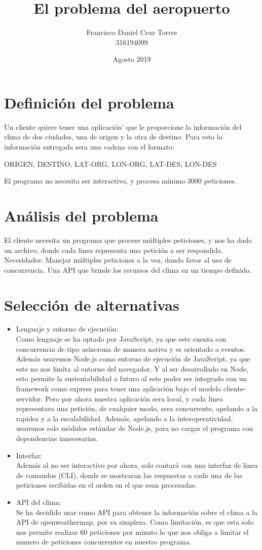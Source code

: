 \documentclass{article}
\title{El problema del aeropuerto}
\author{Francisco Daniel Cruz Torres \\ 316194099}
\date{Agosto 2019}
\begin{document}
\maketitle

\section{Definición del problema}
Un cliente quiere tener una aplicación' que le proporcione la información del clima de dos ciudades, una de origen y la otra de destino.
Para esto la información entregada sera una cadena con el formato: \begin{center}
ORIGEN, DESTINO, LAT-ORG, LON-ORG, LAT-DES, LON-DES
\end{center}
El programa no necesita ser interactivo, y procesa mínimo 3000 peticiones.

\section{Análisis del problema}
El cliente necesita un programa que procese múltiples peticiones, y nos ha dado un archivo, donde cada linea representa una petición a ser respondida.
Necesidades:
Manejar múltiples peticiones a la vez, dando favor al uso de concurrencia.
Una API que brinde los recursos del clima en un tiempo definido.

\section{Selección de alternativas}
\begin{itemize}
\item Lenguaje y entorno de ejecución:\\
    Como lenguaje se ha optado por JavaScript, ya que este cuenta con concurrencia de tipo asíncrona de manera nativa y  es orientado a eventos.
    Además usaremos Node.js como entorno de ejecución de JavaScript, ya que este no nos limita al entorno del navegador. Y al ser desarrollado en Node, esto permite la sustentabilidad a futuro al este poder ser integrado con un framework como express para tener una aplicación bajo el modelo cliente-servidor.
    Pero por ahora nuestra aplicación sera local, y cada linea representara una petición, de cualquier modo, sera concurrente, apelando a la rapidez y a la escalabilidad. Además, apelando a la interoperatividad, usaremos solo módulos estándar de Node.js, para no cargar el programa con dependencias innecesarias.
\item Interfaz:\\
    Además al no ser interactivo por ahora, solo contará con una interfaz de linea de comandos (CLI), donde se mostraran las respuestas a cada una de las peticiones recibidas en el orden en el que sean procesadas.
\item API del clima:\\
    Se ha decidido usar como API para obtener la información sobre el clima a la API de openweathermap, por su simpleza. Como limitación, es que esta solo nos permite realizar 60 peticiones por minuto lo que nos obliga a limitar el numero de peticiones concurrentes en nuestro programa.
\end{itemize}
\end{document}
